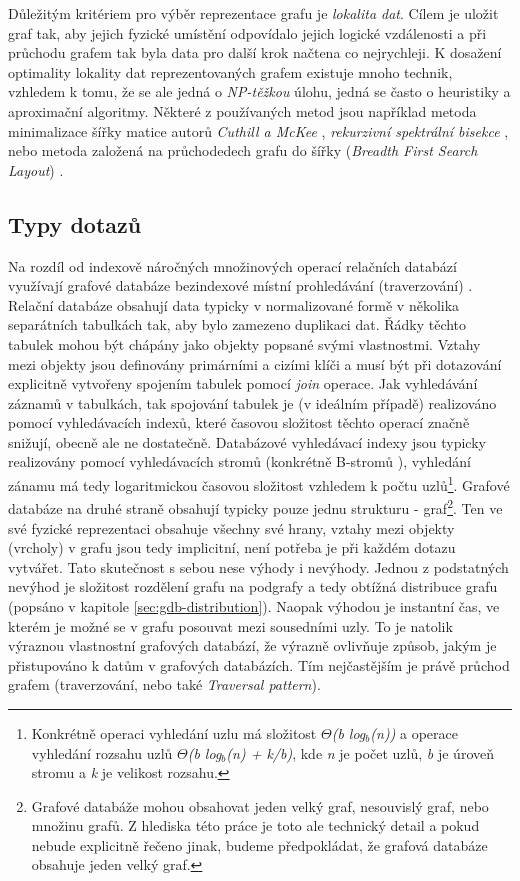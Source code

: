 Důležitým kritériem pro výběr reprezentace grafu je \textit{lokalita dat}. Cílem je uložit graf tak, aby jejich fyzické umístění odpovídalo jejich logické vzdálenosti a při průchodu grafem tak byla data pro další krok načtena co nejrychleji. K dosažení optimality lokality dat reprezentovaných grafem existuje mnoho technik, vzhledem k tomu, že se ale jedná o \textit{NP-těžkou} úlohu, jedná se často o heuristiky a aproximační algoritmy. Některé z používaných metod jsou například metoda minimalizace šířky matice autorů \textit{Cuthill a McKee} \cite{Cuthill69}, \textit{rekurzivní spektrální bisekce} \cite{Barnard93}, nebo metoda založená na průchodedech grafu do šířky (\textit{Breadth First Search Layout}) \cite{Furaih98}.


\subsection{Typy dotazů}
\label{sec:gdb-dotazy}

Na rozdíl od indexově náročných množinových operací relačních databází využívají grafové databáze bezindexové místní prohledávání (traverzování) \cite{Anglels08}. Relační databáze obsahují data typicky v normalizované formě v několika separátních tabulkách tak, aby bylo zamezeno duplikaci dat. Řádky těchto tabulek mohou být chápány jako objekty popsané svými vlastnostmi. Vztahy mezi objekty jsou definovány primárními a cizími klíči a musí být při dotazování explicitně vytvořeny spojením tabulek pomocí \textit{join} operace. Jak vyhledávání záznamů v tabulkách, tak spojování tabulek je (v ideálním případě) realizováno pomocí vyhledávacích indexů, které časovou složitost těchto operací značně snižují, obecně ale ne dostatečně. Databázové vyhledávací indexy jsou typicky realizovány pomocí vyhledávacích stromů (konkrétně B-stromů \cite{Leach05}), vyhledání zánamu má tedy logaritmickou časovou složitost vzhledem k počtu uzlů\footnote{Konkrétně operaci vyhledání uzlu má složitost \textit{$\Theta$(b log$_b$(n))} a operace vyhledání rozsahu uzlů \textit{$\Theta$(b log$_b$(n) + k/b)}, kde \textit{n} je počet uzlů, \textit{b} je úroveň stromu a \textit{k} je velikost rozsahu.\cite{Cormen09}}. 
Grafové databáze na druhé straně obsahují typicky pouze jednu strukturu - graf\footnote{Grafové databáže mohou obsahovat jeden velký graf, nesouvislý graf, nebo množinu grafů. Z hlediska této práce je toto ale technický detail a pokud nebude explicitně řečeno jinak, budeme předpokládat, že grafová databáze obsahuje jeden velký graf.}. Ten ve své fyzické reprezentaci obsahuje všechny své hrany, vztahy mezi objekty (vrcholy) v grafu jsou tedy implicitní, není potřeba je při každém dotazu vytvářet. Tato skutečnost s sebou nese výhody i nevýhody. Jednou z podstatných nevýhod je složitost rozdělení grafu na podgrafy a tedy obtížná distribuce grafu (popsáno v kapitole \ref{sec:gdb-distribution}). Naopak výhodou je instantní čas, ve kterém je možné se v grafu posouvat mezi sousedními uzly. To je natolik výraznou vlastnostní grafových databází, že výrazně ovlivňuje způsob, jakým je přistupováno k datům v grafových databázích. Tím nejčastějším je právě průchod grafem (traverzování, nebo také \textit{Traversal pattern}). 

